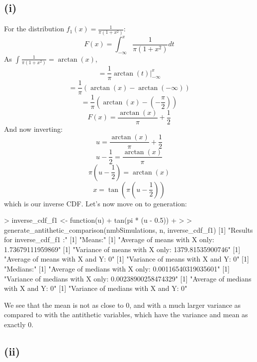 \documentclass{article}
\begin{document}
{\subsection*{(i)} 

For the distribution \(f_1(x) = \frac{1}{\pi(1+x^2)}\):
\[
  F(x) = \int_{-\infty}^{x} \frac{1}{\pi(1+x^2)} dt
\]
As \(\int \frac{1}{\pi(1+x^2)} = \arctan(x)\),
\[
  = \frac{1}{\pi} \arctan(t) |_{-\infty}^{x}
\]
\[
  = \frac{1}{\pi} (\arctan(x) - \arctan(-\infty))
\]
\[
  = \frac{1}{\pi} (\arctan(x) - (-\frac{\pi}{2}))
\]
\[
  F(x) = \frac{\arctan(x)}{\pi} + \frac{1}{2}
\]
And now inverting:
\[
  u = \frac{\arctan(x)}{\pi} + \frac{1}{2}
\]
\[
  u - \frac{1}{2} = \frac{\arctan(x)}{\pi}
\]
\[
  \pi(u - \frac{1}{2}) = \arctan(x)
\]
\[
  x = \tan(\pi(u - \frac{1}{2}))
\]
which is our inverse CDF. Let's now move on to generation:
\begin{spverbatim}
> inverse_cdf_f1 <- function(u) {
+   tan(pi * (u - 0.5))
+ }
> 
> generate_antithetic_comparison(nmbSimulations, n, inverse_cdf_f1)
[1] "Results for inverse_cdf_f1 :"
[1] "Means:"
[1] "Average of means with X only: 1.73679111959869"
[1] "Variance of means with X only: 1379.81535900746"
[1] "Average of means with X and Y: 0"
[1] "Variance of means with X and Y: 0"
[1] "Medians:"
[1] "Average of medians with X only: 0.00116540319035601"
[1] "Variance of medians with X only: 0.00238900258474329"
[1] "Average of medians with X and Y: 0"
[1] "Variance of medians with X and Y: 0"
\end{spverbatim}
We see that the mean is not as close to 0, and with a much larger variance as compared to with the antithetic variables, which have the variance and mean as exactly 0.

\subsection*{(ii)}

}
\end{document}
